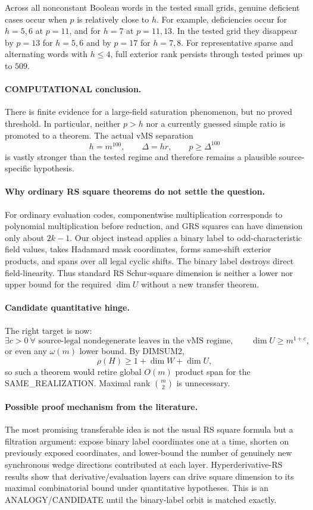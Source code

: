 \documentclass[11pt]{article}
\begin{document}
Across all nonconstant Boolean words in the tested small grids, genuine deficient cases occur when $p$ is relatively close to $h$. For example, deficiencies occur for $h=5,6$ at $p=11$, and for $h=7$ at $p=11,13$. In the tested grid they disappear by $p=13$ for $h=5,6$ and by $p=17$ for $h=7,8$. For representative sparse and alternating words with $h\le4$, full exterior rank persists through tested primes up to $509$.

\paragraph{COMPUTATIONAL conclusion.}
There is finite evidence for a large-field saturation phenomenon, but no proved threshold. In particular, neither $p>h$ nor a currently guessed simple ratio is promoted to a theorem. The actual vMS separation
\[
h=m^{100},\qquad \Delta=hr,\qquad p\ge\Delta^{100}
\]
is vastly stronger than the tested regime and therefore remains a plausible source-specific hypothesis.

\paragraph{Why ordinary RS square theorems do not settle the question.}
For ordinary evaluation codes, componentwise multiplication corresponds to polynomial multiplication before reduction, and GRS squares can have dimension only about $2k-1$. Our object instead applies a binary label to odd-characteristic field values, takes Hadamard mask coordinates, forms same-shift exterior products, and spans over all legal cyclic shifts. The binary label destroys direct field-linearity. Thus standard RS Schur-square dimension is neither a lower nor upper bound for the required $\dim U$ without a new transfer theorem.

\paragraph{Candidate quantitative hinge.}
The right target is now:
\[
\exists c>0\ \forall\text{ source-legal nondegenerate leaves in the vMS regime},\qquad
\dim U\ge m^{1+c},
\]
or even any $\omega(m)$ lower bound. By DIMSUM2,
\[
\rho(H)\ge1+\dim W+\dim U,
\]
so such a theorem would retire global $O(m)$ product span for the SAME_REALIZATION. Maximal rank $\binom m2$ is unnecessary.

\paragraph{Possible proof mechanism from the literature.}
The most promising transferable idea is not the usual RS square formula but a filtration argument: expose binary label coordinates one at a time, shorten on previously exposed coordinates, and lower-bound the number of genuinely new synchronous wedge directions contributed at each layer. Hyperderivative-RS results show that derivative/evaluation layers can drive square dimension to its maximal combinatorial bound under quantitative hypotheses. This is an ANALOGY/CANDIDATE until the binary-label orbit is matched exactly.
\end{document}
